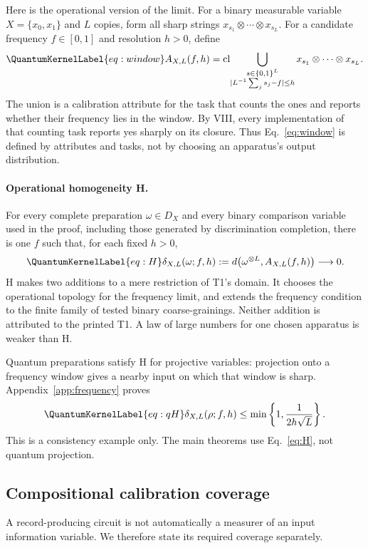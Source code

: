 \documentclass[a4paper,11pt,twocolumn,unpublished]{quantumarticle}
\let\label\QuantumKernelLabel
\DeclareMathOperator{\cl}{cl}
\begin{document}
Here is the operational version of the limit. For a binary measurable variable $X=\{x_0,x_1\}$ and $L$ copies, form all sharp strings $x_{s_1}\otimes\cdots\otimes x_{s_L}$. For a candidate frequency $f\in[0,1]$ and resolution $h>0$, define
\begin{equation}\label{eq:window}
 A_{X,L}(f,h)=\cl\!\bigcup_{\substack{s\in\{0,1\}^L\\|L^{-1}\sum_j s_j-f|\leq h}}
 x_{s_1}\otimes\cdots\otimes x_{s_L}.
\end{equation}
The union is a calibration attribute for the task that counts the ones and reports whether their frequency lies in the window. By VIII, every implementation of that counting task reports yes sharply on its closure. Thus Eq.~\eqref{eq:window} is defined by attributes and tasks, not by choosing an apparatus's output distribution.

\paragraph{Operational homogeneity H.}
For every complete preparation $\omega\in D_X$ and every binary comparison variable used in the proof, including those generated by discrimination completion, there is one $f$ such that, for each fixed $h>0$,
\begin{equation}\label{eq:H}
 \delta_{X,L}(\omega;f,h):=d\bigl(\omega^{\otimes L},A_{X,L}(f,h)\bigr)\longrightarrow0.
\end{equation}
H makes two additions to a mere restriction of T1's domain. It chooses the operational topology for the frequency limit, and extends the frequency condition to the finite family of tested binary coarse-grainings. Neither addition is attributed to the printed T1. A law of large numbers for one chosen apparatus is weaker than H.

Quantum preparations satisfy H for projective variables: projection onto a frequency window gives a nearby input on which that window is sharp. Appendix~\ref{app:frequency} proves
\begin{equation}\label{eq:qH}
 \delta_{X,L}(\rho;f,h)\leq\min\left\{1,\frac{1}{2h\sqrt L}\right\}.
\end{equation}
This is a consistency example only. The main theorems use Eq.~\eqref{eq:H}, not quantum projection.

\subsection{Compositional calibration coverage}
A record-producing circuit is not automatically a measurer of an input information variable. We therefore state its required coverage separately.
\end{document}
